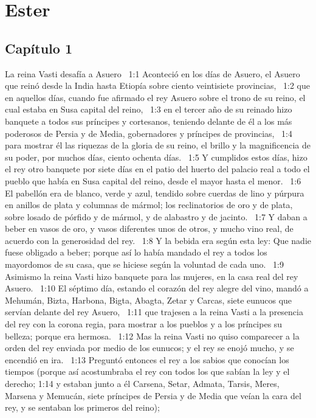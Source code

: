 \chapter{Ester}
\section*{Capítulo 1 }
La reina Vasti desafía a Asuero  
1:1 Aconteció en los días de Asuero, el Asuero que reinó desde la India hasta Etiopía sobre ciento veintisiete provincias,  
1:2 que en aquellos días, cuando fue afirmado el rey Asuero sobre el trono de su reino, el cual estaba en Susa capital del reino,  
1:3 en el tercer año de su reinado hizo banquete a todos sus príncipes y cortesanos, teniendo delante de él a los más poderosos de Persia y de Media, gobernadores y príncipes de provincias,  
1:4 para mostrar él las riquezas de la gloria de su reino, el brillo y la magnificencia de su poder, por muchos días, ciento ochenta días.  
1:5 Y cumplidos estos días, hizo el rey otro banquete por siete días en el patio del huerto del palacio real a todo el pueblo que había en Susa capital del reino, desde el mayor hasta el menor.  
1:6 El pabellón era de blanco, verde y azul, tendido sobre cuerdas de lino y púrpura en anillos de plata y columnas de mármol; los reclinatorios de oro y de plata, sobre losado de pórfido y de mármol, y de alabastro y de jacinto.  
1:7 Y daban a beber en vasos de oro, y vasos diferentes unos de otros, y mucho vino real, de acuerdo con la generosidad del rey.  
1:8 Y la bebida era según esta ley: Que nadie fuese obligado a beber; porque así lo había mandado el rey a todos los mayordomos de su casa, que se hiciese según la voluntad de cada uno.  
1:9 Asimismo la reina Vasti hizo banquete para las mujeres, en la casa real del rey Asuero.  
1:10 El séptimo día, estando el corazón del rey alegre del vino, mandó a Mehumán, Bizta, Harbona, Bigta, Abagta, Zetar y Carcas, siete eunucos que servían delante del rey Asuero,  
1:11 que trajesen a la reina Vasti a la presencia del rey con la corona regia, para mostrar a los pueblos y a los príncipes su belleza; porque era hermosa.  
1:12 Mas la reina Vasti no quiso comparecer a la orden del rey enviada por medio de los eunucos; y el rey se enojó mucho, y se encendió en ira.  
1:13 Preguntó entonces el rey a los sabios que conocían los tiempos (porque así acostumbraba el rey con todos los que sabían la ley y el derecho; 
1:14 y estaban junto a él Carsena, Setar, Admata, Tarsis, Meres, Marsena y Memucán, siete príncipes de Persia y de Media que veían la cara del rey, y se sentaban los primeros del reino);  
